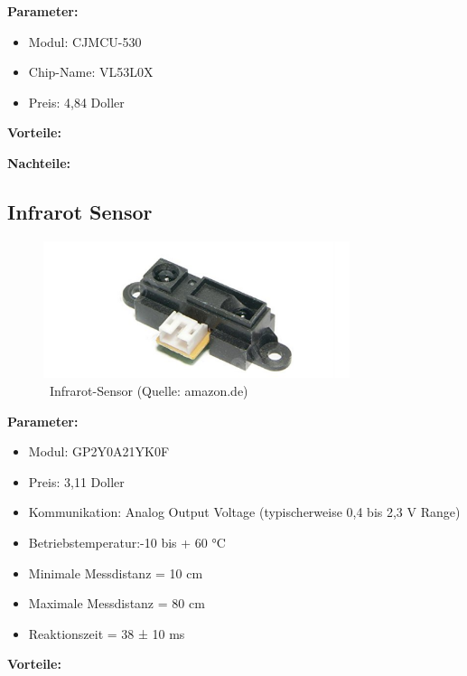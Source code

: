 \textbf{Parameter:}  %

\begin{itemize}
\item Modul: CJMCU-530
\item Chip-Name: VL53L0X
\item Preis: 4,84 Doller
\end{itemize}

\par\bigskip %
\textbf{Vorteile:}  %

\par\bigskip %
\textbf{Nachteile:}  %

\subsection{Infrarot Sensor}

\begin{figure}[ht]  %
	\centering\includegraphics[width=0.8\textwidth]{images/infrarot.png}
	\caption{ \ Infrarot-Sensor  (Quelle: amazon.de)}
	\label{infrarot} %
\end{figure}

\textbf{Parameter:}  %

\begin{itemize}
\item Modul: GP2Y0A21YK0F
\item Preis: 3,11 Doller
\item Kommunikation: Analog Output Voltage (typischerweise 0,4 bis 2,3 V Range)
\item Betriebstemperatur:-10 bis + 60 °C
\item Minimale Messdistanz = 10 cm
\item Maximale Messdistanz = 80 cm
\item Reaktionszeit = 38 ± 10 ms
\end{itemize}

\par\bigskip %
\textbf{Vorteile:}  %

